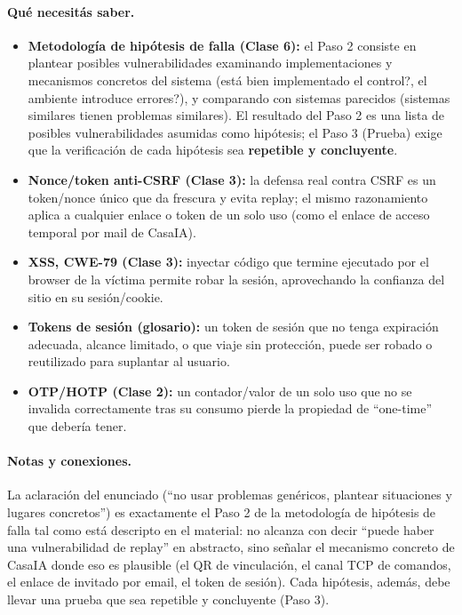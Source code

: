 \paragraph{Qué necesitás saber.}
\begin{itemize}
  \item \textbf{Metodología de hipótesis de falla (Clase 6):} el Paso 2 consiste en
  plantear posibles vulnerabilidades examinando implementaciones y mecanismos
  concretos del sistema (\textquestiondown{}está bien implementado el control?, \textquestiondown{}el ambiente
  introduce errores?), y comparando con sistemas parecidos (sistemas similares
  tienen problemas similares). El resultado del Paso 2 es una lista de posibles
  vulnerabilidades asumidas como hipótesis; el Paso 3 (Prueba) exige que la
  verificación de cada hipótesis sea \textbf{repetible y concluyente}.
  \item \textbf{Nonce/token anti-CSRF (Clase 3):} la defensa real contra CSRF es un
  token/nonce único que da frescura y evita replay; el mismo razonamiento aplica a
  cualquier enlace o token de un solo uso (como el enlace de acceso temporal por
  mail de CasaIA).
  \item \textbf{XSS, CWE-79 (Clase 3):} inyectar código que termine ejecutado por
  el browser de la víctima permite robar la sesión, aprovechando la confianza del
  sitio en su sesión/cookie.
  \item \textbf{Tokens de sesión (glosario):} un token de sesión que no tenga
  expiración adecuada, alcance limitado, o que viaje sin protección, puede ser
  robado o reutilizado para suplantar al usuario.
  \item \textbf{OTP/HOTP (Clase 2):} un contador/valor de un solo uso que no se
  invalida correctamente tras su consumo pierde la propiedad de ``one-time'' que
  debería tener.
\end{itemize}

\paragraph{Notas y conexiones.}
La aclaración del enunciado (``no usar problemas genéricos, plantear situaciones y
lugares concretos'') es exactamente el Paso 2 de la metodología de hipótesis de
falla tal como está descripto en el material: no alcanza con decir ``puede haber
una vulnerabilidad de replay'' en abstracto, sino señalar el mecanismo concreto de
CasaIA donde eso es plausible (el QR de vinculación, el canal TCP de comandos, el
enlace de invitado por email, el token de sesión). Cada hipótesis, además, debe
llevar una prueba que sea repetible y concluyente (Paso 3).


